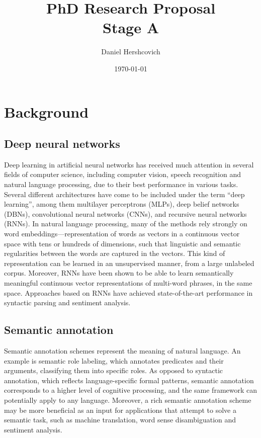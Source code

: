 \documentclass[11pt]{article} \usepackage{cite}
\begin{document}
\title{PhD Research Proposal \\ Stage A} \author{Daniel Hershcovich}
\date{\today} \maketitle


\section{Background}

\subsection{Deep neural networks}

Deep learning in artificial neural networks has received much attention in
several fields of computer science, including computer vision, speech
recognition and natural language processing, due to their best performance in
various tasks. Several different architectures have come to be included under
the term “deep learning”, among them multilayer perceptrons (MLPs), deep belief
networks (DBNs), convolutional neural networks (CNNs), and recursive neural
networks (RNNs). In natural language processing, many of the methods rely
strongly on word embeddings---representation of words as vectors in a continuous
vector space with tens or hundreds of dimensions, such that linguistic and
semantic regularities between the words are captured in the vectors. This kind
of representation can be learned in an unsupervised manner, from a large
unlabeled corpus. Moreover, RNNs have been shown to be able to learn
semantically meaningful continuous vector representations of multi-word phrases,
in the same space. Approaches based on RNNs have achieved state-of-the-art
performance in syntactic parsing and sentiment analysis.

\subsection{Semantic annotation}

Semantic annotation schemes represent the meaning of natural language. An
example is semantic role labeling, which annotates predicates and their
arguments, classifying them into specific roles. As opposed to syntactic
annotation, which reflects language-specific formal patterns, semantic
annotation corresponds to a higher level of cognitive processing, and the same
framework can potentially apply to any language. Moreover, a rich semantic
annotation scheme may be more beneficial as an input for applications that
attempt to solve a semantic task, such as machine translation, word sense
disambiguation and sentiment analysis.
\end{document}
